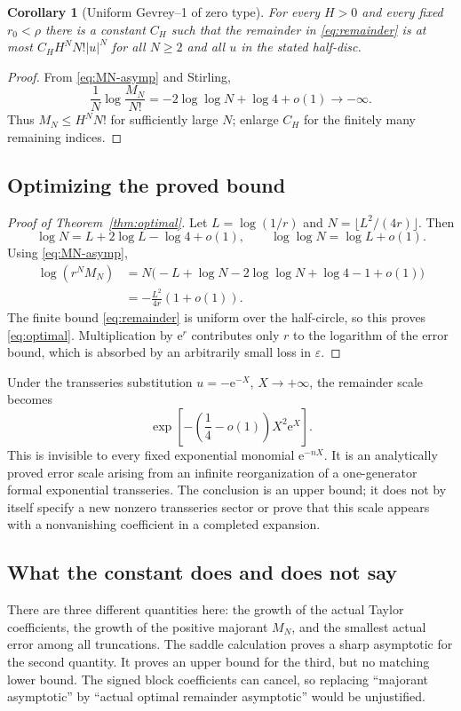\documentclass[11pt,a4paper]{article}
\numberwithin{equation}{section}
\newtheorem{corollary}[theorem]{Corollary}
\theoremstyle{definition}
\theoremstyle{remark}
\newcommand{\ee}{\mathrm e}
\begin{document}
\begin{corollary}[Uniform Gevrey--1 of zero type]
For every $H>0$ and every fixed $r_0<\rho$ there is a constant $C_H$ such
that the remainder in \eqref{eq:remainder} is at most
$C_H H^N N! |u|^N$ for all $N\ge2$ and all $u$ in the stated half-disc.
\end{corollary}
\begin{proof}
From \eqref{eq:MN-asymp} and Stirling,
\[
 \frac1N\log\frac{M_N}{N!}
 =-2\log\log N+\log4+o(1)\longrightarrow-\infty.
\]
Thus $M_N\le H^N N!$ for sufficiently large $N$; enlarge $C_H$ for the
finitely many remaining indices.
\end{proof}

\subsection{Optimizing the proved bound}
\begin{proof}[Proof of Theorem~\ref{thm:optimal}]
Let $L=\log(1/r)$ and $N=\lfloor L^2/(4r)\rfloor$.  Then
\[
 \log N=L+2\log L-\log4+o(1),
 \qquad \log\log N=\log L+o(1).
\]
Using \eqref{eq:MN-asymp},
\begin{align*}
 \log(r^N M_N)
 &=N\bigl(-L+\log N-2\log\log N+\log4-1+o(1)\bigr)\\
 &=-\frac{L^2}{4r}(1+o(1)).
\end{align*}
The finite bound \eqref{eq:remainder} is uniform over the half-circle,
so this proves \eqref{eq:optimal}.  Multiplication by $\ee^r$ contributes
only $r$ to the logarithm of the error bound, which is absorbed by an
arbitrarily small loss in $\varepsilon$.
\end{proof}

Under the transseries substitution $u=-\ee^{-X}$, $X\to+\infty$, the
remainder scale becomes
\begin{equation}
 \exp\!\left[-\left(\frac14-o(1)\right)X^2\ee^X\right].
 \label{eq:deep-flat}
\end{equation}
This is invisible to every fixed exponential monomial $\ee^{-nX}$.
It is an analytically proved error scale arising from an infinite
reorganization of a one-generator formal exponential transseries.
The conclusion is an upper bound; it does not by itself specify a new
nonzero transseries sector or prove that this scale appears with a
nonvanishing coefficient in a completed expansion.

\subsection{What the constant does and does not say}
There are three different quantities here: the growth of the actual
Taylor coefficients, the growth of the positive majorant $M_N$, and the
smallest actual error among all truncations.  The saddle calculation
proves a sharp asymptotic for the second quantity.  It proves an upper
bound for the third, but no matching lower bound.  The signed block
coefficients can cancel, so replacing ``majorant asymptotic'' by
``actual optimal remainder asymptotic'' would be unjustified.
\end{document}
